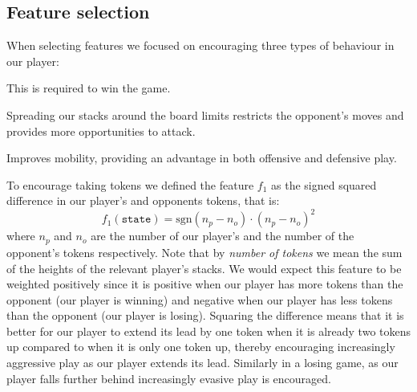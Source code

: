 \documentclass[11pt]{article}
\begin{document}
\subsection{Feature selection} \label{sec:feature-selection}
When selecting features we focused on encouraging three types of behaviour in our player: 
\begin{description}[labelindent=\parindent]
    \item[Taking tokens:] This is required to win the game.
    \item[Controlling space:] Spreading our stacks around the board limits restricts the opponent's moves and provides more opportunities to attack. 
    \item[Stacking:] Improves mobility, providing an advantage in both offensive and defensive play.
\end{description}
To encourage taking tokens we defined the feature $f_1$ as the signed squared difference in our player's and opponents tokens, that is:
\[
    f_1(\texttt{state}) = \textrm{sgn} (n_p - n_o) \cdot (n_p - n_o) ^2
\]
where $n_p$ and $n_o$ are the number of our player's and the number of the opponent's tokens respectively. Note that by \textit{number of tokens} we mean the sum of the heights of the relevant player's stacks. We would expect this feature to be weighted positively since it is positive when our player has more tokens than the opponent (our player is winning) and negative when our player has less tokens than the opponent (our player is losing). Squaring the difference means that it is better for our player to extend its lead by one token when it is already two tokens up compared to when it is only one token up, thereby encouraging increasingly aggressive play as our player extends its lead. Similarly in a losing game, as our player falls further behind increasingly evasive play is encouraged.
\end{document}
